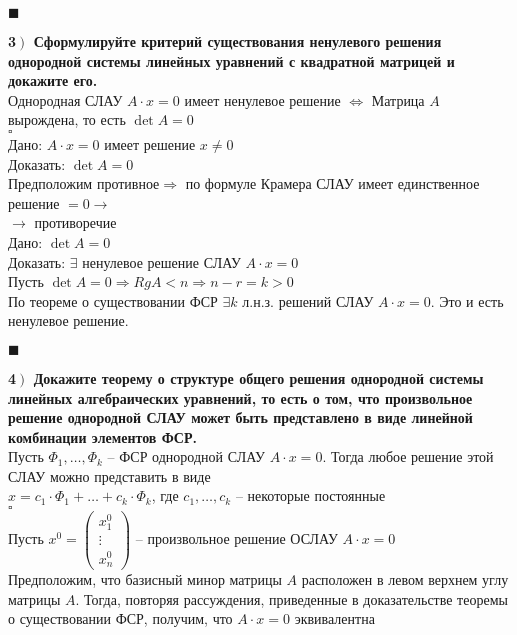 \documentclass[a4paper,12pt]{article}
\begin{document}
\begin{flushright}
	$\blacksquare$
\end{flushright}
\textbf{3$\left.\right)$ Сформулируйте критерий существования ненулевого решения однородной системы линейных уравнений с квадратной матрицей и докажите его.}\\
Однородная СЛАУ $A\cdot x=0$ имеет ненулевое решение $\Leftrightarrow$ Матрица $A$ вырождена, то есть $\det A=0$\\
$\square$\\
Дано: $A\cdot x=0$ имеет решение $x\ne0$\\
Доказать: $\det A=0$\\
Предположим противное$\Rightarrow$ по формуле Крамера СЛАУ имеет единственное решение $=0\rightarrow$\\$\rightarrow$ противоречие\\
Дано: $\det A=0$\\
Доказать: $\exists$ ненулевое решение СЛАУ $A\cdot x=0$\\
Пусть $\det A=0\Rightarrow RgA<n\Rightarrow n-r=k>0$\\
По теореме о существовании ФСР $\exists k$ л.н.з. решений СЛАУ $A\cdot x=0$. Это и есть ненулевое решение.
\begin{flushright}
	$\blacksquare$
\end{flushright}
\textbf{4$\left.\right)$ Докажите теорему о структуре общего решения однородной системы линейных алгебраических уравнений, то есть о том, что произвольное решение однородной СЛАУ может быть представлено в виде линейной комбинации элементов ФСР.}\\
Пусть $\Phi_1, \ldots, \Phi_k$ -- ФСР однородной СЛАУ $A\cdot x=0$. Тогда любое решение этой СЛАУ можно представить в виде\\
$x=c_1\cdot\Phi_1+\ldots+c_k\cdot\Phi_k$, где $c_1,\ldots, c_k$ -- некоторые постоянные\\
$\square$\\
Пусть $x^0=\begin{pmatrix}
x_1^0\\
\vdots\\
x_n^0
\end{pmatrix}$ -- произвольное решение ОСЛАУ $A\cdot x=0$\\
Предположим, что базисный минор матрицы $A$ расположен в левом верхнем углу матрицы $A$. Тогда, повторяя рассуждения, приведенные в доказательстве теоремы о существовании ФСР, получим, что $A\cdot x=0$ эквивалентна\\
\\
\end{document}
